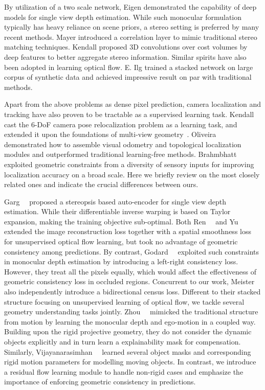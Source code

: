 \documentclass[10pt,twocolumn,letterpaper]{article}
\begin{document}
By utilization of a two scale network, Eigen \etal\cite{EigenPF14} demonstrated the capability of deep models for single view depth estimation. While such monocular formulation typically has heavy reliance on scene priors, a stereo setting is preferred by many recent methods. Mayer \etal\cite{MayerIHFCDB15} introduced a correlation layer to mimic traditional stereo matching techniques. Kendall \etal\cite{kendall2017end} proposed 3D convolutions over cost volumes  by deep features to better aggregate stereo information. Similar spirits have also been adopted in learning optical flow. 
E. Ilg \etal\cite{IMKDB17} trained a stacked network on large corpus of synthetic data and achieved impressive result on par with traditional methods.

Apart from the above problems as dense pixel prediction, camera localization and tracking have also proven to be tractable as a supervised learning task. Kendall~\etal~\cite{kendall2015convolutional} cast the 6-DoF camera pose relocalization problem as a learning task, and extended it upon the foundations of multi-view geometry~\cite{kendall2017geometric}. Oliveira~\etal~\cite{OliveiraRBB17} demonstrated how to assemble visual odometry and topological localization modules and outperformed traditional learning-free methods. Brahmbhatt~\etal~\cite{MapNet17} exploited geometric constraints from a diversity of sensory inputs for improving localization accuracy on a broad scale.
Here we briefly review on the most closely related ones and indicate the crucial differences between ours. 

Garg~\etal~\cite{GargBR16} proposed a stereopsis based auto-encoder for single view depth estimation. While their differentiable inverse warping is based on Taylor expansion, making the training objective sub-optimal.
Both Ren~\etal~\cite{Ren2017UnsupervisedDL} and Yu~\etal~\cite{YuHD16} extended the image reconstruction loss together with a spatial smoothness loss for unsupervised optical flow learning, but took no advantage of geometric consistency among predictions. 
By contrast, Godard~\etal~\cite{monodepth17} exploited such constraints in monocular depth estimation by introducing a left-right consistency loss. 
However, they treat all the pixels equally, which would affect the effectiveness of geometric consistency loss in occluded regions. %
Concurrent to our work, Meister~\etal~\cite{Meister:2018:UUL} also independently introduce a bidirectional census loss. Different to their stacked structure focusing on unsupervised learning of optical flow, we tackle several geometry understanding tasks jointly. 
Zhou~\etal~\cite{zhou2017unsupervised} mimicked the traditional structure from motion by learning the monocular depth and ego-motion in a coupled way. Building upon the rigid projective geometry, they do not consider the dynamic objects explicitly and in turn learn a explainability mask for compensation. Similarly, Vijayanarasimhan~\etal~\cite{Vijayanarasimhan17} learned several object masks and corresponding rigid motion parameters for modelling moving objects. In contrast, we introduce a residual flow learning module to handle non-rigid cases and emphasize the importance of enforcing geometric consistency in predictions. 
\end{document}
